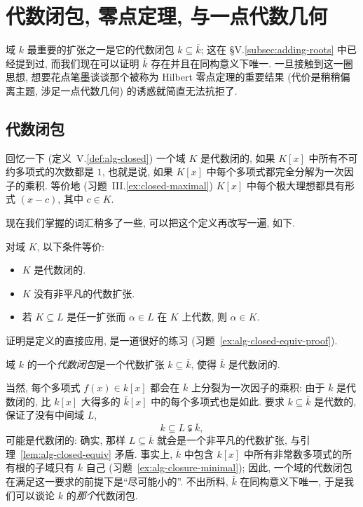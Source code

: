 \section{代数闭包, 零点定理, 与一点代数几何}
\label{sec:alg-closure-nullstellensatz}

域 $k$ 最重要的扩张之一是它的代数闭包 $k\subseteq\overline{k}$; 这在 §V.\ref{subsec:adding-roots} 中已经提到过, 而我们现在可以证明 $\overline{k}$ 存在并且在同构意义下唯一. 一旦接触到这一圈思想, 想要花点笔墨谈谈那个被称为 Hilbert 零点定理的重要结果 (代价是稍稍偏离主题, 涉足一点代数几何) 的诱惑就简直无法抗拒了.

\subsection{代数闭包}
\label{subsec:algebraic-closure}

回忆一下 (定义~V.\ref{def:alg-closed}) 一个域 $K$ 是代数闭的, 如果 $K[x]$ 中所有不可约多项式的次数都是 $1$, 也就是说, 如果 $K[x]$ 中每个多项式都完全分解为一次因子的乘积. 等价地 (习题~III.\ref{ex:closed-maximal}) $K[x]$ 中每个极大理想都具有形式 $(x-c)$, 其中 $c\in K$.

现在我们掌握的词汇稍多了一些, 可以把这个定义再改写一遍, 如下.

\begin{lemma}\label{lem:alg-closed-equiv}
对域 $K$, 以下条件等价:
\begin{itemize}
\item $K$ 是代数闭的.
\item $K$ 没有非平凡的代数扩张.
\item 若 $K\subseteq L$ 是任一扩张而 $\alpha\in L$ 在 $K$ 上代数, 则 $\alpha\in K$.
\end{itemize}
\end{lemma}

证明是定义的直接应用, 是一道很好的练习 (习题~\ref{ex:alg-closed-equiv-proof}).

\begin{definition}\label{def:algebraic-closure}
域 $k$ 的一个\emph{代数闭包}是一个代数扩张 $k\subseteq\overline{k}$, 使得 $\overline{k}$ 是代数闭的.
\end{definition}

当然, 每个多项式 $f(x)\in k[x]$ 都会在 $\overline{k}$ 上分裂为一次因子的乘积: 由于 $\overline{k}$ 是代数闭的, 比 $k[x]$ 大得多的 $\overline{k}[x]$ 中的每个多项式也是如此. 要求 $k\subseteq\overline{k}$ 是代数的, 保证了没有中间域 $L$,
\[
k\subseteq L\subsetneqq\overline{k},
\]
可能是代数闭的: 确实, 那样 $L\subseteq\overline{k}$ 就会是一个非平凡的代数扩张, 与引理~\ref{lem:alg-closed-equiv} 矛盾. 事实上, $\overline{k}$ 中包含 $k[x]$ 中所有非常数多项式的所有根的子域只有 $\overline{k}$ 自己 (习题~\ref{ex:alg-closure-minimal}); 因此, 一个域的代数闭包在满足这一要求的前提下是``尽可能小的''. 不出所料, $\overline{k}$ 在同构意义下唯一, 于是我们可以谈论 $k$ 的\emph{那个}代数闭包.

